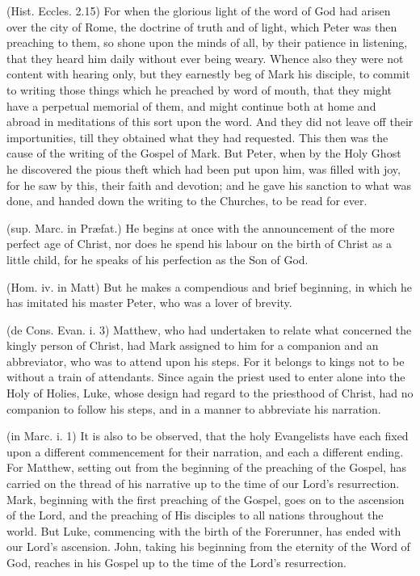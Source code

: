  (Hist. Eccles. 2.15) For when the glorious light of the word of God had arisen over the city of Rome, the doctrine of truth and of light, which Peter was then preaching to them, so shone upon the minds of all, by their patience in listening, that they heard him daily without ever being weary. Whence also they were not content with hearing only, but they earnestly beg of Mark his disciple, to commit to writing those things which he preached by word of mouth, that they might have a perpetual memorial of them, and might continue both at home and abroad in meditations of this sort upon the word. And they did not leave off their importunities, till they obtained what they had requested. This then was the cause of the writing of the Gospel of Mark. But Peter, when by the Holy Ghost he discovered the pious theft which had been put upon him, was filled with joy, for he saw by this, their faith and devotion; and he gave his sanction to what was done, and handed down the writing to the Churches, to be read for ever.

 (sup. Marc. in Præfat.) He begins at once with the announcement of the more perfect age of Christ, nor does he spend his labour on the birth of Christ as a little child, for he speaks of his perfection as the Son of God.

 (Hom. iv. in Matt) But he makes a compendious and brief beginning, in which he has imitated his master Peter, who was a lover of brevity.

 (de Cons. Evan. i. 3) Matthew, who had undertaken to relate what concerned the kingly person of Christ, had Mark assigned to him for a companion and an abbreviator, who was to attend upon his steps. For it belongs to kings not to be without a train of attendants. Since again the priest used to enter alone into the Holy of Holies, Luke, whose design had regard to the priesthood of Christ, had no companion to follow his steps, and in a manner to abbreviate his narration.

 (in Marc. i. 1) It is also to be observed, that the holy Evangelists have each fixed upon a different commencement for their narration, and each a different ending. For Matthew, setting out from the beginning of the preaching of the Gospel, has carried on the thread of his narrative up to the time of our Lord’s resurrection. Mark, beginning with the first preaching of the Gospel, goes on to the ascension of the Lord, and the preaching of His disciples to all nations throughout the world. But Luke, commencing with the birth of the Forerunner, has ended with our Lord’s ascension. John, taking his beginning from the eternity of the Word of God, reaches in his Gospel up to the time of the Lord’s resurrection.

